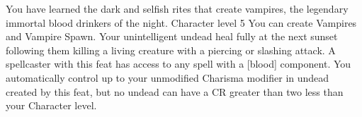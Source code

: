 \shortdescfeat
{You have learned the dark and selfish rites that create vampires, the legendary immortal blood drinkers of the night.}
{Character level 5}
{You can create Vampires and Vampire Spawn. Your unintelligent undead heal fully at the next sunset following them killing a living creature with a piercing or slashing attack. A spellcaster with this feat has access to any spell with a [blood] component. You automatically control up to your unmodified Charisma modifier in undead created by this feat, but no undead can have a CR greater than two less than your Character level.}

